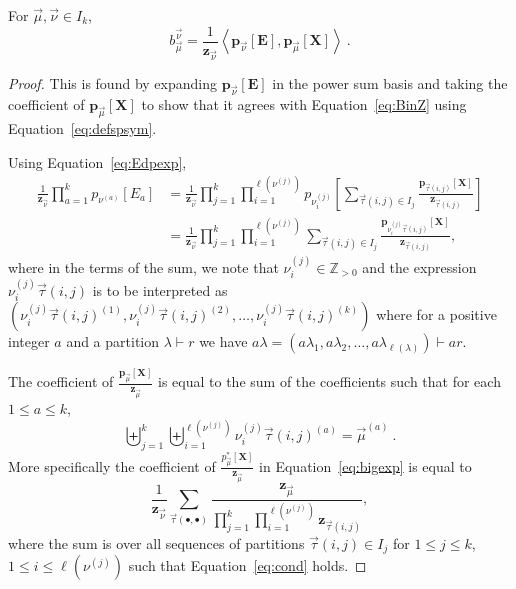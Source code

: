 \documentclass[ALCO,Unicode]{cedram}
\newcommand{\ZZ}{\mathbb Z}
\newcommand{\XXX}{\mathbf{X}}
\newcommand{\EEE}{\mathbf{E}}
\begin{document}
\begin{cor}\label{cor:bscalar}
For $\vec{\mu}, \vec{\nu} \in I_k$,
\begin{equation}\label{eq:sfbcoef}
b_{\vec{\mu}}^{\vec{\nu}}
= \frac{1}{\mathbf{z}_{\vec{\nu}}}\left< \mathbf{p}_{\vec{\nu}}[\EEE], \mathbf{p}_{\vec{\mu}}[\XXX] \right>~.
\end{equation}
\end{cor}
\begin{proof}
This is found by expanding $\mathbf{p}_{\vec{\nu}}[\EEE]$
in the power sum basis and taking the coefficient of $\mathbf{p}_{\vec{\mu}}[\XXX]$
to show that it agrees with Equation~\eqref{eq:BinZ} using Equation~\eqref{eq:defspsym}.

Using Equation~\eqref{eq:Edpexp},
\begin{align}
\frac{1}{\mathbf{z}_{\vec{\nu}}} \prod_{a=1}^k p_{\nu^{(a)}}[E_a]
&=
\frac{1}{\mathbf{z}_{\vec{\nu}}} \prod_{j=1}^k
\prod_{i=1}^{\ell(\nu^{(j)})} p_{\nu^{(j)}_i}\left[
\sum_{\vec{\tau}(i,j) \in I_j}
\frac{\mathbf{p}_{\vec{\tau}(i,j)}[\XXX]}{\mathbf{z}_{\vec{\tau}(i,j)}}\right]\\
&=\label{eq:bigexp}
\frac{1}{\mathbf{z}_{\vec{\nu}}} \prod_{j=1}^k
\prod_{i=1}^{\ell(\nu^{(j)})}
\sum_{\vec{\tau}(i,j) \in I_j}
\frac{\mathbf{p}_{\nu^{(j)}_i\vec{\tau}(i,j)}[\XXX]}{\mathbf{z}_{\vec{\tau}(i,j)}},
\end{align}
where in the terms of the sum, we note that $\nu^{(j)}_i \in \ZZ_{>0}$
and the expression $\nu^{(j)}_i\vec{\tau}(i,j)$ is to be interpreted
as $( \nu^{(j)}_i \vec{\tau}(i,j)^{(1)}, \nu^{(j)}_i \vec{\tau}(i,j)^{(2)},
\ldots, \nu^{(j)}_i \vec{\tau}(i,j)^{(k)})$ where for a positive integer $a$
and a partition $\lambda \vdash r$ we have
$a \lambda = (a \lambda_1, a \lambda_2,
\ldots, a \lambda_{\ell(\lambda)})\vdash ar$.

The coefficient of $\frac{\mathbf{p}_{\vec{\mu}}[\XXX]}{\mathbf{z}_{\vec{\mu}}}$
is equal to the sum of the coefficients such that
for each $1 \leqslant a \leqslant k$,
\begin{equation}\label{eq:cond}
    \biguplus_{j=1}^k \biguplus_{i=1}^{\ell(\nu^{(j)})} \nu^{(j)}_i\vec{\tau}(i,j)^{(a)} = \vec{\mu}^{(a)}~.
\end{equation}
More specifically the coefficient of $\frac{p^\ast_{\vec{\mu}}[\XXX]}{\mathbf{z}_{\vec{\mu}}}$
in Equation~\eqref{eq:bigexp} is equal to
\begin{equation}\label{eq:coeffp}
    \frac{1}{\mathbf{z}_{\vec{\nu}}}
    \sum_{\vec{\tau}(\bullet,\bullet)}
    \frac{\mathbf{z}_{\vec{\mu}}}
    {\prod_{j=1}^k \prod_{i=1}^{\ell(\nu^{(j)})} \mathbf{z}_{\vec{\tau}(i,j)}},
\end{equation}
where the sum is over all sequences of partitions $\vec{\tau}(i,j) \in I_j$ for $1\leqslant j \leqslant k$,
$1 \leqslant i \leqslant \ell(\nu^{(j)})$ such that
Equation~\eqref{eq:cond} holds.
\end{proof}
\end{document}
